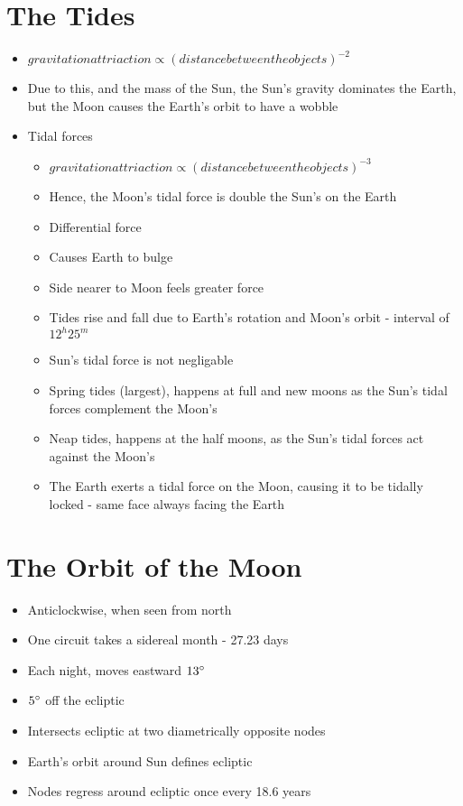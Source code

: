 \documentclass[a4paper, 11pt]{article}
\begin{document}
\section{The Tides}
	\begin{itemize}
		\item \(gravitation attriaction \propto (distance between the objects)^{-2}\)
		\item Due to this, and the mass of the Sun, the Sun's gravity dominates the Earth, but the Moon causes the Earth's orbit to have a wobble
		\item Tidal forces
		\begin{itemize}
			\item \(gravitation attriaction \propto (distance between the objects)^{-3}\)
			\item Hence, the Moon's tidal force is double the Sun's on the Earth
			\item Differential force
			\item Causes Earth to bulge
			\item Side nearer to Moon feels greater force
			\item Tides rise and fall due to Earth's rotation and Moon's orbit - interval of \(12^h 25^m\)
			\item Sun's tidal force is not negligable
			\item Spring tides (largest), happens at full and new moons as the Sun's tidal forces complement the Moon's
			\item Neap tides, happens at the half moons, as the Sun's tidal forces act against the Moon's
			\item The Earth exerts a tidal force on the Moon, causing it to be tidally locked - same face always facing the Earth
		\end{itemize}
	\end{itemize}

\section{The Orbit of the Moon}
	\begin{itemize}
		\item Anticlockwise, when seen from north
		\item One circuit takes a sidereal month - 27.23 days
		\item Each night, moves eastward \(13\degree\)
		\item \(5\degree\) off the ecliptic
		\item Intersects ecliptic at two diametrically opposite nodes
		\item Earth's orbit around Sun defines ecliptic
		\item Nodes regress around ecliptic once every 18.6 years
	\end{itemize}
\end{document}
